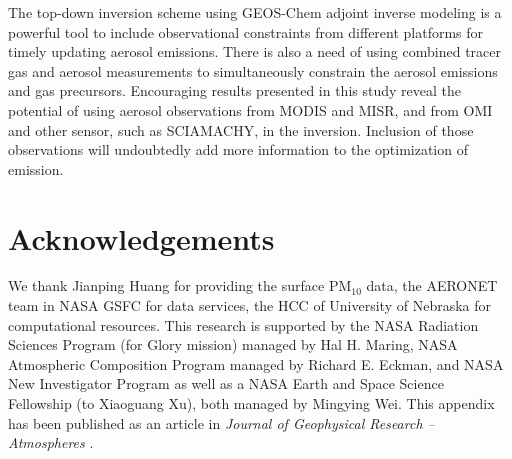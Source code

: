 The top-down inversion scheme using GEOS-Chem adjoint inverse modeling
is a powerful tool to include observational constraints from different
platforms for timely updating aerosol emissions. There is also a need of
using combined tracer gas and aerosol measurements to simultaneously
constrain the aerosol emissions and gas precursors.
Encouraging results presented in this study reveal the potential of
using aerosol observations from MODIS and MISR,  and 
from OMI and other sensor, such as SCIAMACHY, in the inversion.
Inclusion of those observations will undoubtedly add more information to
the optimization of emission.

\section{Acknowledgements}

We thank Jianping Huang for providing the surface PM$_{10}$ data, the
AERONET team in NASA GSFC for data services, the HCC of University of
Nebraska for computational resources. This research is supported by the
NASA Radiation Sciences Program (for Glory mission) managed by Hal H.
Maring, NASA Atmospheric Composition Program managed by Richard E.
Eckman, and NASA New Investigator Program as well as a NASA Earth and
Space Science Fellowship (to Xiaoguang Xu), both managed by Mingying
Wei. This appendix has been published as an article in \textit{Journal
of Geophysical Research – Atmospheres} \citep{Xu13}.
